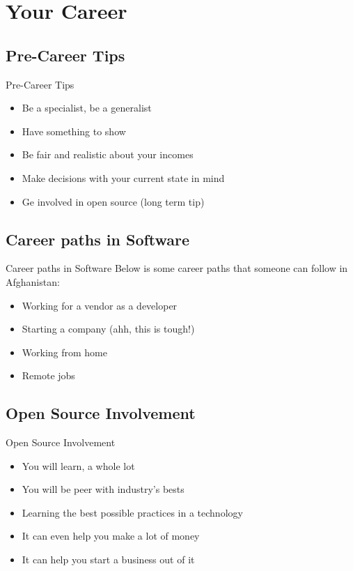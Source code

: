 \documentclass{beamer}
\begin{document}
\section{Your Career}
\subsection{Pre-Career Tips}
\begin{frame}{Pre-Career Tips}
	\begin{itemize}
		\item Be a specialist, be a generalist
		\item Have something to show
		\item Be fair and realistic about your incomes
		\item Make decisions with your current state in mind
		\item Ge involved in open source (long term tip)
	\end{itemize}
\end{frame}

\subsection{Career paths in Software}
\begin{frame}{Career paths in Software}
	Below is some career paths that someone can follow in Afghanistan:
	\begin{itemize}
		\item Working for a vendor as a developer
		\item Starting a company (ahh, this is tough!)
		\item Working from home
		\item Remote jobs
	\end{itemize}
\end{frame}

\subsection{Open Source Involvement}
\begin{frame}{Open Source Involvement}
	\begin{itemize}
		\item You will learn, a whole lot
		\item You will be peer with industry's bests
		\item Learning the best possible practices in a technology
		\item It can even help you make a lot of money
		\item It can help you start a business out of it
	\end{itemize}
\end{frame}
\end{document}
